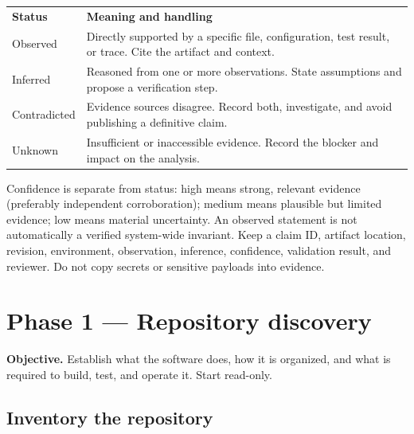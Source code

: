 \documentclass[11pt,letterpaper]{article}
\newcommand{\tablehead}[2]{\rowcolor{navy}\color{white}\textbf{#1}&\color{white}\textbf{#2}\\}
\begin{document}
\noindent\begin{tabularx}{\linewidth}{@{}P{1.45in}Y@{}}
\tablehead{Status}{Meaning and handling}
Observed & Directly supported by a specific file, configuration, test result, or trace. Cite the artifact and context.\\
Inferred & Reasoned from one or more observations. State assumptions and propose a verification step.\\
Contradicted & Evidence sources disagree. Record both, investigate, and avoid publishing a definitive claim.\\
Unknown & Insufficient or inaccessible evidence. Record the blocker and impact on the analysis.\\
\bottomrule
\end{tabularx}
Confidence is separate from status: high means strong, relevant evidence (preferably independent corroboration); medium means plausible but limited evidence; low means material uncertainty. An observed statement is not automatically a verified system-wide invariant. Keep a claim ID, artifact location, revision, environment, observation, inference, confidence, validation result, and reviewer. Do not copy secrets or sensitive payloads into evidence.
\clearpage
\section{Phase 1 --- Repository discovery}
\textbf{Objective.} Establish what the software does, how it is organized, and what is required to build, test, and operate it. Start read-only.
\subsection{Inventory the repository}
\end{document}
